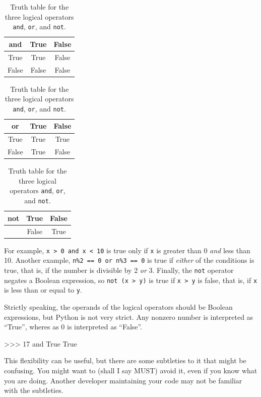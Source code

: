 \begin{table}[htb]
\begin{center}
\begin{minipage}[t]{.3\textwidth}
\begin{tabular}{|c|cc|}
\hline
and   & True  & False \\\hline
True  & True  & False \\
False & False & False \\\hline
\end{tabular}
\end{minipage}
%
\begin{minipage}[t]{.3\textwidth}
\begin{tabular}{|c|cc|}
\hline
or    & True  & False \\\hline
True  & True  & True  \\
False & True  & False \\\hline
\end{tabular}
\end{minipage}
%
\begin{minipage}[t]{.3\textwidth}
\begin{tabular}{|c|cc|}
\hline
not  & True  & False\\\hline
     & False & True \\\hline
\end{tabular}
\end{minipage}
%
\caption{Truth table for the three logical operators {\tt and}, {\tt or}, and {\tt not}.}
\label{tab:truth_table}
\end{center}
\end{table}

%

%
 For example, {\tt x > 0 and x < 10} is true only if {\tt x} is greater than 0
{\em and} less than 10. Another example, {\tt n\%2 == 0 or n\%3 == 0} is true if {\em either} of the conditions
is true, that is, if the number is divisible by 2 {\em or} 3.
%
Finally, the {\tt not} operator negates a Boolean
expression, so {\tt not (x > y)} is true if {\tt x > y} is false,
that is, if {\tt x} is less than or equal to {\tt y}.

\begin{remark}
Strictly speaking, the operands of the logical operators should be
Boolean expressions, but Python is not very strict.
Any nonzero number is interpreted as ``True'', wheres as 0 is interpreted as ``False''.

\beforeverb
\begin{pyinterpreter}
>>> 17 and True
True
\end{pyinterpreter}
\afterverb
%
This flexibility can be useful, but there are some subtleties to
it that might be confusing.  You might want to (shall I say MUST) avoid it, even if
you know what you are doing. Another developer maintaining your code may not be familiar with the subtleties.

\end{remark}


